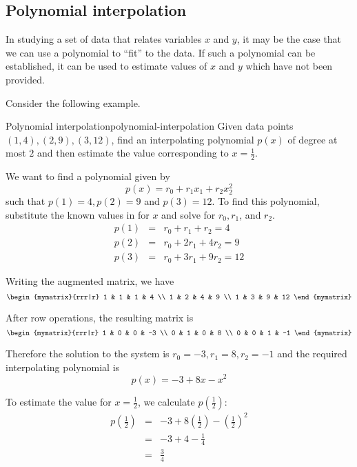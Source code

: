 \subsection{Polynomial interpolation}

In studying a set of data that relates variables $x$ and $y$, it may be the case that we can use a polynomial to ``fit'' to the data. If such a polynomial can be established, it can be used to estimate values of $x$ and $y$ which have not been provided.

Consider the following example.

\begin{example}{Polynomial interpolation}{polynomial-interpolation}
Given data points $(1,4), (2,9), (3,12)$, find an interpolating polynomial $p(x)$ of degree at most $2$ and then estimate the value corresponding to $x = \frac{1}{2}$.
\end{example}

\begin{solution}
We want to find a polynomial given by
\[
p(x) = r_0 + r_1x_1 + r_2x_2^2
\]
such that $p(1)=4, p(2)=9$ and $p(3)=12$.
To find this polynomial, substitute the known values in for $x$ and solve for $r_0, r_1$, and $r_2$.
\begin{eqnarray*}
p(1) &=& r_0 + r_1 + r_2 = 4\\
p(2) &=& r_0 + 2r_1 + 4r_2 = 9\\
p(3) &=& r_0 + 3r_1 + 9r_2 = 12
\end{eqnarray*}

Writing the augmented matrix, we have
\[
\begin{mymatrix}{rrr|r}
1 & 1 & 1 & 4 \\
1 & 2 & 4 & 9  \\
1 & 3 & 9 & 12
\end{mymatrix}
\]

After row operations, the resulting matrix is
\[
\begin{mymatrix}{rrr|r}
1 & 0 & 0 & -3 \\
0 & 1 & 0 & 8 \\
0 & 0 & 1 & -1
\end{mymatrix}
\]

Therefore the solution to the system is $r_0 = -3, r_1 = 8, r_2 = -1$ and the required interpolating polynomial is
\[
p(x) = -3 + 8x - x^2
\]

To estimate the value for $x = \frac{1}{2}$, we calculate $p(\frac{1}{2})$:
\begin{eqnarray*}
p(\frac{1}{2}) &=& -3 + 8(\frac{1}{2}) - (\frac{1}{2})^2\\
&=& -3 + 4 - \frac{1}{4} \\
&=& \frac{3}{4}
\end{eqnarray*}
\end{solution}

